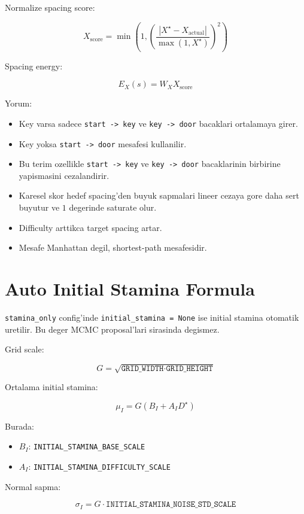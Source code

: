 \documentclass[11pt]{article}
\begin{document}
Normalize spacing score:

\[
X_{\text{score}}
=
\min
\left(
1,
\left(
  \frac{
    |X^\star - X_{\text{actual}}|
  }{
    \max(1, X^\star)
  }
\right)^2
\right)
\]

Spacing energy:

\[
E_X(s)
=
W_X X_{\text{score}}
\]

Yorum:

\begin{itemize}
  \item Key varsa sadece \texttt{start -> key} ve \texttt{key -> door} bacaklari ortalamaya girer.
  \item Key yoksa \texttt{start -> door} mesafesi kullanilir.
  \item Bu terim ozellikle \texttt{start -> key} ve \texttt{key -> door} bacaklarinin birbirine yapismasini cezalandirir.
  \item Karesel skor hedef spacing'den buyuk sapmalari lineer cezaya gore daha sert buyutur ve $1$ degerinde saturate olur.
  \item Difficulty arttikca target spacing artar.
  \item Mesafe Manhattan degil, shortest-path mesafesidir.
\end{itemize}

\section{Auto Initial Stamina Formula}

\texttt{stamina\_only} config'inde \texttt{initial\_stamina = None} ise initial stamina otomatik uretilir.
Bu deger MCMC proposal'lari sirasinda degismez.

Grid scale:

\[
G
=
\sqrt{\texttt{GRID\_WIDTH} \cdot \texttt{GRID\_HEIGHT}}
\]

Ortalama initial stamina:

\[
\mu_I
=
G
\left(
B_I
+
A_I D^\star
\right)
\]

Burada:

\begin{itemize}
  \item $B_I$: \texttt{INITIAL\_STAMINA\_BASE\_SCALE}
  \item $A_I$: \texttt{INITIAL\_STAMINA\_DIFFICULTY\_SCALE}
\end{itemize}

Normal sapma:

\[
\sigma_I
=
G
\cdot
\texttt{INITIAL\_STAMINA\_NOISE\_STD\_SCALE}
\]
\end{document}
